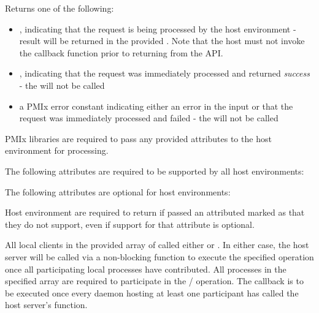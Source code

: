 Returns one of the following:

\begin{itemize}
    \item {}, indicating that the request is being processed by the host environment - result will be returned in the provided . Note that the host must not invoke the callback function prior to returning from the \ac{API}.
    \item {}, indicating that the request was immediately processed and returned \textit{success} - the  will not be called
    \item a PMIx error constant indicating either an error in the input or that the request was immediately processed and failed - the  will not be called
\end{itemize}

\reqattrstart
\ac{PMIx} libraries are required to pass any provided attributes to the host environment for processing.

\divider

The following attributes are required to be supported by all host environments:


\reqattrend

\optattrstart
The following attributes are optional for host environments:


\optattrend

\advicermstart
Host environment are required to return  if passed an attributed marked as  that they do not support, even if support for that attribute is optional.
\advicermend

\descr

All local clients in the provided array of  called either  or .
In either case, the host server will be called via a non-blocking function to execute the specified operation once all participating local processes have contributed.
All processes in the specified  array are required to participate in the / operation.
The callback is to be executed once every daemon hosting at least one participant has called the host server's  function.

